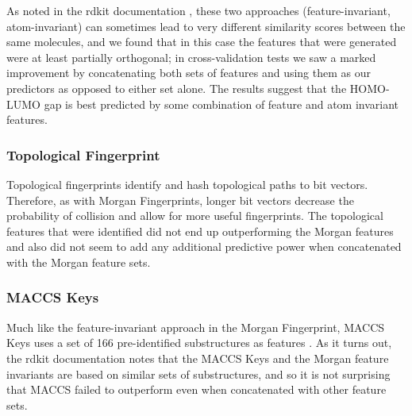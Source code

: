 \documentclass[11pt]{article}
\begin{document}
As noted in the rdkit documentation \cite{landrum}, these two approaches (feature-invariant, atom-invariant) can sometimes lead to very different similarity scores between the same molecules, and we found that in this case the features that were generated were at least partially orthogonal; in cross-validation tests we saw a marked improvement by concatenating both sets of features and using them as our predictors as opposed to either set alone. The results suggest that the HOMO-LUMO gap is best predicted by some combination of feature and atom invariant features.
\subsubsection*{Topological Fingerprint}
Topological fingerprints identify and hash topological paths to bit vectors. Therefore, as with Morgan Fingerprints, longer bit vectors decrease the probability of collision and allow for more useful fingerprints. The topological features that were identified did not end up outperforming the Morgan features and also did not seem to add any additional predictive power when concatenated with the Morgan feature sets. 
\subsubsection*{MACCS Keys}
Much like the feature-invariant approach in the Morgan Fingerprint, MACCS Keys uses a set of 166 pre-identified substructures as features \cite{dalke}. As it turns out, the rdkit documentation notes that the MACCS Keys and the Morgan feature invariants are based on similar sets of substructures, and so it is not surprising that MACCS failed to outperform even when concatenated with other feature sets. 
\end{document}
